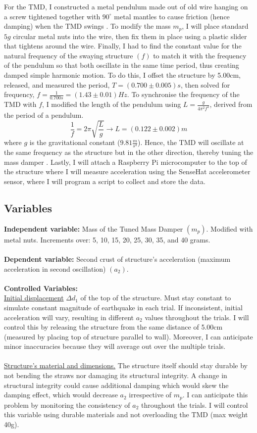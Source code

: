 \documentclass[11pt]{article}
\begin{document}
For the TMD, I constructed a metal pendulum made out of old wire hanging on a screw tightened together with $90^{\circ}$ metal mantles to cause friction (hence damping) when the TMD swings \autocite{lourenco}. To modify the mass $m_p$, I will place standard $5g$ circular metal nuts into the wire, then fix them in place using a plastic slider that tightens around the wire. Finally, I had to find the constant value for the natural frequency of the swaying structure $(f)$ to match it with the frequency of the pendulum so that both oscillate in the same time period, thus creating damped simple harmonic motion. To do this, I offset the structure by 5.00cm, released, and measured the period, $T=(0.700\pm 0.005)s$, then solved for frequency, $f=\frac{1}{0.700s}=(1.43\pm0.01)Hz$. To synchronise the frequency of the TMD with $f$, I modified the length of the pendulum using $L=\frac{g}{4\pi^2f^2}$, derived from the period of a pendulum. $$\frac{1}{f}=2\pi\sqrt{\frac{L}{g}} \rightarrow L=(0.122\pm0.002)m$$ where $g$ is the gravitational constant ($9.81 \frac{m}{s^2}$). Hence, the TMD will oscillate at the same frequency as the structure but in the other direction, thereby tuning the mass damper \autocite{connor}. Lastly, I will attach a Raspberry Pi microcomputer to the top of the structure where I will measure acceleration using the SenseHat accelerometer sensor, where I will program a script to collect and store the data.

\subsection{Variables}

\textbf{Independent variable: }
Mass of the Tuned Mass Damper $(m_p)$. Modified with metal nuts. Increments over: 5, 10, 15, 20, 25, 30, 35, and 40 grams.
\\ \\
\textbf{Dependent variable:}
Second crust of structure's acceleration (maximum acceleration in second oscillation) $(a_2)$.
\\ \\
\textbf{Controlled Variables:}
\\ \underline{Initial displacement} $\Delta d_1$ of the top of the structure. Must stay constant to simulate constant magnitude of earthquake in each trial. If inconsistent, initial acceleration will vary, resulting in different $a_2$ values throughout the trials. I will control this by releasing the structure from the same distance of 5.00cm (measured by placing top of structure parallel to wall). Moreover, I can anticipate minor inaccuracies because they will average out over the multiple trials.
\\ \\ \underline{Structure’s material and dimensions.} The structure itself should stay durable by not bending the straws nor damaging its structural integrity. A change in structural integrity could cause additional damping which would skew the damping effect, which would decrease $a_2$ irrespective of $m_p$. I can anticipate this problem by monitoring the consistency of $a_2$ throughout the trials. I will control this variable using durable materials and not overloading the TMD (max weight 40g).
\end{document}
